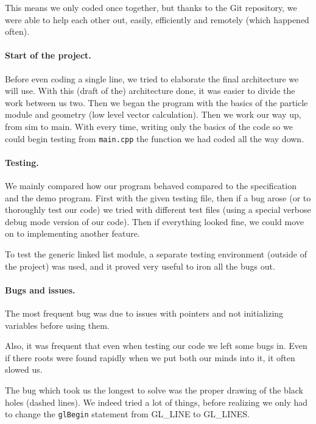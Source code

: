 \documentclass[a4paper]{article} %
\begin{document}
\begin{multicols*}{2}
This means we only coded once together, but thanks to the Git repository,
we were able to help each other out, easily, efficiently and remotely (which happened often).

\paragraph{Start of the project.} Before even coding a single line, we tried to elaborate the final
architecture we will use. With this (draft of the) architecture done, it was easier
to divide the work between us two.
Then we began the program with the basics of the particle module and geometry (low level vector calculation).
Then we work our way up, from sim to main. With every time, writing only the basics of the code so we could begin testing from \texttt{main.cpp}
the function we had coded all the way down.

\paragraph{Testing.}
We mainly compared how our program behaved compared to the specification and the demo program.
First with the given testing file, then if a bug arose (or to thoroughly test our code)
we tried with different test files (using a special verbose debug mode version of our code).
Then if everything looked fine, we could move on to implementing another feature.

To test the generic linked list module, a separate testing environment (outside of the project)
was used, and it proved very useful to iron all the bugs out.

\paragraph{Bugs and issues.}
The most frequent bug was due to issues with pointers and not initializing variables before using them.

Also, it was frequent that even when testing our code we left some bugs in.
Even if there roots were found rapidly when we put both our minds into it, it often slowed us.

The bug which took us the longest to solve was the proper drawing of the black holes (dashed lines).
We indeed tried a lot of things, before realizing we only had to change the \texttt{glBegin} statement from GL\_LINE to GL\_LINES.



\end{multicols*}
\end{document}
